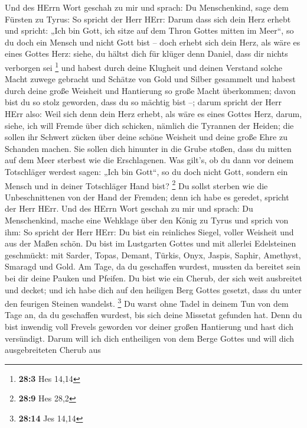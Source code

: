  Und des HErrn Wort geschah zu mir und sprach:
 Du Menschenkind, sage dem Fürsten zu Tyrus: So spricht
der Herr HErr: Darum dass sich dein Herz erhebt und spricht: „Ich bin
Gott, ich sitze auf dem Thron Gottes mitten im Meer``, so du doch ein
Mensch und nicht Gott bist -- doch erhebt sich dein Herz, als wäre es
eines Gottes Herz:  siehe, du hältst dich für klüger denn
Daniel, dass dir nichts verborgen sei \footnote{\textbf{28:3} Hes 14,14}
 und habest durch deine Klugheit und deinen Verstand
solche Macht zuwege gebracht und Schätze von Gold und Silber gesammelt
 und habest durch deine große Weisheit und Hantierung so
große Macht überkommen; davon bist du so stolz geworden, dass du so
mächtig bist --;  darum spricht der Herr HErr also: Weil
sich denn dein Herz erhebt, als wäre es eines Gottes Herz,
 darum, siehe, ich will Fremde über dich schicken, nämlich
die Tyrannen der Heiden; die sollen ihr Schwert zücken über deine schöne
Weisheit und deine große Ehre zu Schanden machen.  Sie
sollen dich hinunter in die Grube stoßen, dass du mitten auf dem Meer
sterbest wie die Erschlagenen.  Was gilt's, ob du dann vor
deinem Totschläger werdest sagen: „Ich bin Gott``, so du doch nicht
Gott, sondern ein Mensch und in deiner Totschläger Hand bist?
\footnote{\textbf{28:9} Hes 28,2}  Du sollst sterben wie
die Unbeschnittenen von der Hand der Fremden; denn ich habe es geredet,
spricht der Herr HErr.  Und des HErrn Wort geschah zu mir
und sprach:  Du Menschenkind, mache eine Wehklage über
den König zu Tyrus und sprich von ihm: So spricht der Herr HErr: Du bist
ein reinliches Siegel, voller Weisheit und aus der Maßen schön.
 Du bist im Lustgarten Gottes und mit allerlei
Edelsteinen geschmückt: mit Sarder, Topas, Demant, Türkis, Onyx, Jaspis,
Saphir, Amethyst, Smaragd und Gold. Am Tage, da du geschaffen wurdest,
mussten da bereitet sein bei dir deine Pauken und Pfeifen.
 Du bist wie ein Cherub, der sich weit ausbreitet und
decket; und ich habe dich auf den heiligen Berg Gottes gesetzt, dass du
unter den feurigen Steinen wandelst. \footnote{\textbf{28:14} Jes 14,14}
 Du warst ohne Tadel in deinem Tun von dem Tage an, da du
geschaffen wurdest, bis sich deine Missetat gefunden hat.
 Denn du bist inwendig voll Frevels geworden vor deiner
großen Hantierung und hast dich versündigt. Darum will ich dich
entheiligen von dem Berge Gottes und will dich ausgebreiteten Cherub aus
